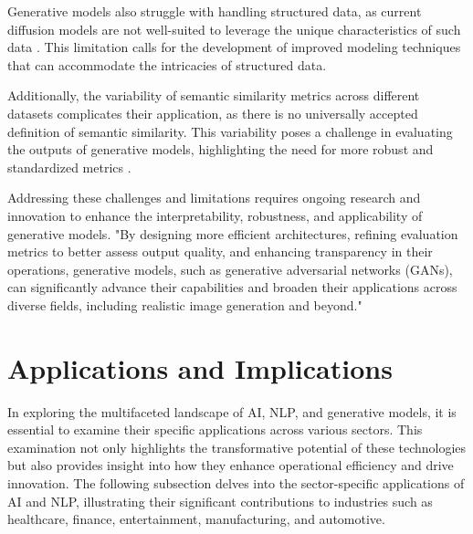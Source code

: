 Generative models also struggle with handling structured data, as current diffusion models are not well-suited to leverage the unique characteristics of such data \cite{koo2023comprehensivesurveygenerativediffusion}. This limitation calls for the development of improved modeling techniques that can accommodate the intricacies of structured data.



Additionally, the variability of semantic similarity metrics across different datasets complicates their application, as there is no universally accepted definition of semantic similarity. This variability poses a challenge in evaluating the outputs of generative models, highlighting the need for more robust and standardized metrics \cite{yamshchikov2020styletransferparaphraselookingsensible}.



Addressing these challenges and limitations requires ongoing research and innovation to enhance the interpretability, robustness, and applicability of generative models. "By designing more efficient architectures, refining evaluation metrics to better assess output quality, and enhancing transparency in their operations, generative models, such as generative adversarial networks (GANs), can significantly advance their capabilities and broaden their applications across diverse fields, including realistic image generation and beyond." \cite{park2023domainadaptationbasedhuman}









\section{Applications and Implications} \label{sec:Applications and Implications}

In exploring the multifaceted landscape of AI, NLP, and generative models, it is essential to examine their specific applications across various sectors. This examination not only highlights the transformative potential of these technologies but also provides insight into how they enhance operational efficiency and drive innovation. The following subsection delves into the sector-specific applications of AI and NLP, illustrating their significant contributions to industries such as healthcare, finance, entertainment, manufacturing, and automotive. 





